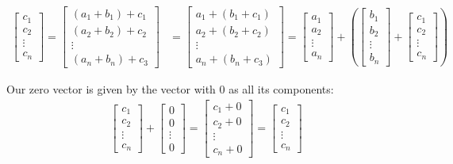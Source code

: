 \documentclass{article}
\begin{document}
\begin{align*}
\begin{bmatrix}
        c_1 \\
        c_2\\
        \vdots\\
        c_n
    \end{bmatrix}=
    \begin{bmatrix}
        (a_1+b_1)+c_1 \\
        (a_2+b_2)+c_2\\
        \vdots\\
        (a_n+b_n)+c_3
    \end{bmatrix}&=\begin{bmatrix}
        a_1+(b_1+c_1) \\
        a_2+(b_2+c_2)\\
        \vdots\\
        a_n+(b_n+c_3)
    \end{bmatrix}=\begin{bmatrix}
        a_1 \\
        a_2\\
        \vdots\\
        a_n
    \end{bmatrix}+\left(\begin{bmatrix}
        b_1 \\
        b_2\\
        \vdots\\
        b_n
    \end{bmatrix}+\begin{bmatrix}
        c_1 \\
        c_2\\
        \vdots\\
        c_n
    \end{bmatrix}\right)\tag{VS3}
\end{align*}

Our zero vector is given by the vector with 0 as all its components:
\begin{align*}
    \begin{bmatrix}
        c_1 \\
        c_2\\
        \vdots\\
        c_n
    \end{bmatrix}+\begin{bmatrix}
        0 \\
        0\\
        \vdots\\
        0
    \end{bmatrix}=\begin{bmatrix}
        c_1+0 \\
        c_2+0\\
        \vdots\\
        c_n+0
    \end{bmatrix}=\begin{bmatrix}
        c_1 \\
        c_2\\
        \vdots\\
        c_n
    \end{bmatrix}\tag{VS4}
\end{align*}
\end{document}
